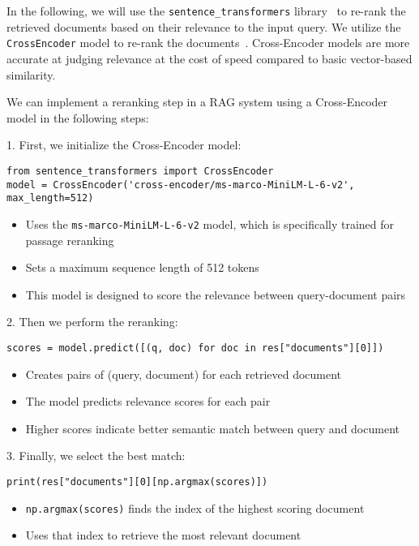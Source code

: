 In the following, we will use the \texttt{sentence\_transformers} library~ to re-rank the retrieved documents based on their relevance to the input query. We utilize the \texttt{CrossEncoder} model to re-rank the documents~. Cross-Encoder models are more accurate at judging relevance at the cost of speed compared to basic vector-based similarity.

We can implement a reranking step in a RAG system using a Cross-Encoder model in the following steps:

1. First, we initialize the Cross-Encoder model:
\begin{verbatim}
from sentence_transformers import CrossEncoder
model = CrossEncoder('cross-encoder/ms-marco-MiniLM-L-6-v2', max_length=512)
\end{verbatim}
\begin{itemize}
    \item Uses the \texttt{ms-marco-MiniLM-L-6-v2} model, which is specifically trained for passage reranking
    \item Sets a maximum sequence length of 512 tokens
    \item This model is designed to score the relevance between query-document pairs
\end{itemize}
2. Then we perform the reranking:
\begin{verbatim}
scores = model.predict([(q, doc) for doc in res["documents"][0]])
\end{verbatim}
\begin{itemize}
    \item Creates pairs of (query, document) for each retrieved document
    \item The model predicts relevance scores for each pair
    \item Higher scores indicate better semantic match between query and document
\end{itemize}

3. Finally, we select the best match:
\begin{verbatim}
print(res["documents"][0][np.argmax(scores)])
\end{verbatim}
\begin{itemize}
    \item \texttt{np.argmax(scores)} finds the index of the highest scoring document
    \item Uses that index to retrieve the most relevant document
\end{itemize}

